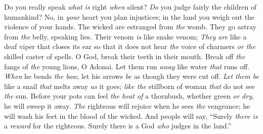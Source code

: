 \begin{biblechapter} %
 Do you really speak \textit{what is} right \textit{when} silent? 
\textit{Do} you judge fairly the children of humankind?
\verse No, in \textit{your} heart you plan injustices; 
in the land you weigh out the violence of your hands.
\verse The wicked are estranged from \textit{the} womb. 
They go astray from \textit{the} belly, speaking lies.
\verse Their venom \textit{is} like snake venom; 
\textit{They are} like a deaf viper that closes its ear
\verse so that it does not hear \textit{the} voice of charmers 
\textit{or the} skilled caster of spells.
\verse O God, break their teeth in their mouth. 
Break off \textit{the} fangs of \textit{the} young lions, O Adonai.
\verse Let them run \textit{away} like water \textit{that} runs off. 
\textit{When} he bends \textit{the bow}, let his arrows \textit{be} as though they were cut off.
\verse \textit{Let them be} like a snail \textit{that} melts away \textit{as} it goes; 
\textit{like the} stillborn of woman \textit{that} do not see \textit{the} sun.
\verse Before your pots can feel \textit{the heat of} a thornbush, 
whether green \textit{or} \textit{dry}, he will sweep it away.
\verse \textit{The} righteous will rejoice when he sees \textit{the} vengeance; 
he will wash his feet in the blood of the wicked.
\verse And people will say, “Surely \textit{there is} a \textit{reward} for the righteous. 
Surely there is a God \textit{who} judges in the land.”
\end{biblechapter}

